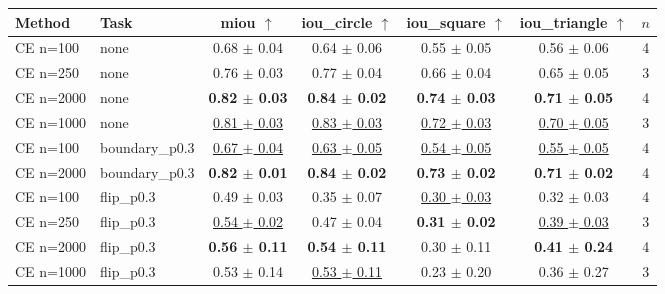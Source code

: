 \begin{tabular}{llccccc}
\toprule
Method & Task & miou $\uparrow$ & iou\_circle $\uparrow$ & iou\_square $\uparrow$ & iou\_triangle $\uparrow$ & $n$ \\
\midrule
CE n=100 & none & 0.68 $\pm$ 0.04 & 0.64 $\pm$ 0.06 & 0.55 $\pm$ 0.05 & 0.56 $\pm$ 0.06 & 4 \\
CE n=250 & none & 0.76 $\pm$ 0.03 & 0.77 $\pm$ 0.04 & 0.66 $\pm$ 0.04 & 0.65 $\pm$ 0.05 & 3 \\
CE n=2000 & none & \textbf{0.82 $\pm$ 0.03} & \textbf{0.84 $\pm$ 0.02} & \textbf{0.74 $\pm$ 0.03} & \textbf{0.71 $\pm$ 0.05} & 4 \\
CE n=1000 & none & \underline{0.81 $\pm$ 0.03} & \underline{0.83 $\pm$ 0.03} & \underline{0.72 $\pm$ 0.03} & \underline{0.70 $\pm$ 0.05} & 3 \\
\midrule
CE n=100 & boundary\_p0.3 & \underline{0.67 $\pm$ 0.04} & \underline{0.63 $\pm$ 0.05} & \underline{0.54 $\pm$ 0.05} & \underline{0.55 $\pm$ 0.05} & 4 \\
CE n=2000 & boundary\_p0.3 & \textbf{0.82 $\pm$ 0.01} & \textbf{0.84 $\pm$ 0.02} & \textbf{0.73 $\pm$ 0.02} & \textbf{0.71 $\pm$ 0.02} & 4 \\
\midrule
CE n=100 & flip\_p0.3 & 0.49 $\pm$ 0.03 & 0.35 $\pm$ 0.07 & \underline{0.30 $\pm$ 0.03} & 0.32 $\pm$ 0.03 & 4 \\
CE n=250 & flip\_p0.3 & \underline{0.54 $\pm$ 0.02} & 0.47 $\pm$ 0.04 & \textbf{0.31 $\pm$ 0.02} & \underline{0.39 $\pm$ 0.03} & 3 \\
CE n=2000 & flip\_p0.3 & \textbf{0.56 $\pm$ 0.11} & \textbf{0.54 $\pm$ 0.11} & 0.30 $\pm$ 0.11 & \textbf{0.41 $\pm$ 0.24} & 4 \\
CE n=1000 & flip\_p0.3 & 0.53 $\pm$ 0.14 & \underline{0.53 $\pm$ 0.11} & 0.23 $\pm$ 0.20 & 0.36 $\pm$ 0.27 & 3 \\
\bottomrule
\end{tabular}
